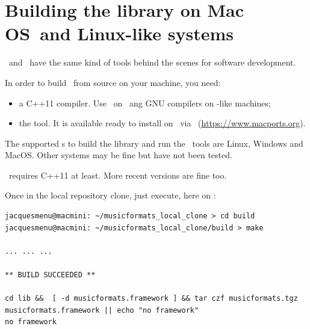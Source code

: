 \section{Building the library on Mac OS\texttrademark\ and Linux-like systems}

\MacOS\ and \Linux\ have the same kind of tools behind the scenes for software development.

In order to build \mf\ from source on your machine, you need:
\begin{itemize}
\item a C++11 compiler. Use \xcode\ on \MacOS\ ang GNU compilers on \Unix -like machines;
\item the  tool. It is available ready to install on \MacOS\ via \macports\ (\url{https://www.macports.org}).
\end{itemize}

The supported \OS s to build the library and run the \CLI\ tools are Linux, Windows and MacOS. Other systems may be fine but have not been tested.

\mf\ requires C++11 at least. More recent versions are fine too.

Once in the local repository clone, just execute, here on \MacOS:
\begin{lstlisting}[language=Terminal]
jacquesmenu@macmini: ~/musicformats_local_clone > cd build
jacquesmenu@macmini: ~/musicformats_local_clone/build > make

... ... ...

** BUILD SUCCEEDED **

cd lib &&  [ -d musicformats.framework ] && tar czf musicformats.tgz musicformats.framework || echo "no framework"
no framework
\end{lstlisting}

